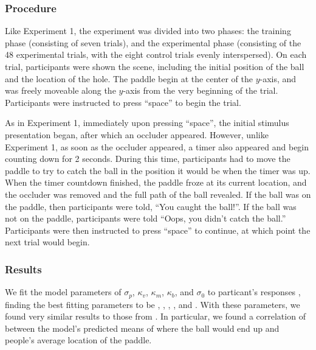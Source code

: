 \documentclass[10pt,letterpaper]{article}
\begin{document}
\subsubsection{Procedure}

Like Experiment 1, the experiment was divided into two phases: the training phase (consisting of seven trials), and the experimental phase (consisting of the 48 experimental trials, with the eight control trials evenly interspersed).
On each trial, participants were shown the scene, including the initial position of the ball and the location of the hole.
The paddle begin at the center of the $y$-axis, and was freely moveable along the $y$-axis from the very beginning of the trial.
Participants were instructed to press ``space'' to begin the trial. 

As in Experiment 1, immediately upon pressing ``space'', the initial stimulus presentation began, after which an occluder appeared.
However, unlike Experiment 1, as soon as the occluder appeared, a timer also appeared and begin counting down for 2 seconds.
During this time, participants had to move the paddle to try to catch the ball in the position it would be when the timer was up.
When the timer countdown finished, the paddle froze at its current location, and the occluder was removed and the full path of the ball revealed.
If the ball was on the paddle, then participants were told, ``You caught the ball!''.
If the ball was not on the paddle, participants were told ``Oops, you didn't catch the ball.''
Participants were then instructed to press ``space'' to continue, at which point the next trial would begin.

\subsubsection{Results}

We fit the model parameters of $\sigma_p$, $\kappa_v$, $\kappa_m$, $\kappa_b$, and $\sigma_0$ to particant's responses \cite<for details, see>{Smith:2013fc}, finding the best fitting parameters to be \perr{}, \kapv{}, \kapm{}, \kapb{}, and \sdzero{}. 
With these parameters, we found very similar results to those from .
In particular, we found a correlation of \PaddleCorr{} between the model's predicted means of where the ball would end up and people's average location of the paddle.



\setlength{\bibleftmargin}{.125in}
\setlength{\bibindent}{-\bibleftmargin}


\end{document}
